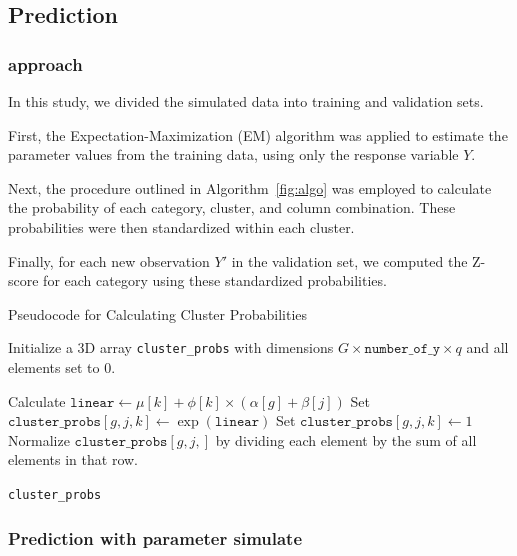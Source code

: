 \documentclass{article}
\begin{document}
\subsection{Prediction}

\subsubsection*{approach}

In this study, we divided the simulated data into training and validation sets.

First, the Expectation-Maximization (EM) algorithm was applied to estimate the parameter values from the training data, using only the response variable $Y$.

Next, the procedure outlined in Algorithm~\ref{fig:algo} was employed to calculate the probability of each category, cluster, and column combination. 
These probabilities were then standardized within each cluster.

Finally, for each new observation $Y'$ in the validation set, we computed the Z-score for each category using these standardized probabilities.
\begin{algorithm}
  \caption{Pseudocode for Calculating Cluster Probabilities}
  \label{fig:algo}
  \begin{algorithmic}[1]
  \STATE Initialize a 3D array \texttt{cluster\_probs} with dimensions $G \times \texttt{number\_of\_y} \times q$ and all elements set to 0.
  
                  \STATE Calculate $\texttt{linear} \gets \mu[k] + \phi[k] \times (\alpha[g] + \beta[j])$
                  \STATE Set $\texttt{cluster\_probs}[g, j, k] \gets \exp(\texttt{linear})$
              \ELSE
                  \STATE Set $\texttt{cluster\_probs}[g, j, k] \gets 1$
              \ENDIF
          \ENDFOR
          \STATE Normalize $\texttt{cluster\_probs}[g, j,]$ by dividing each element by the sum of all elements in that row.
      \ENDFOR
  \ENDFOR
  
  \RETURN \texttt{cluster\_probs}
  \end{algorithmic}
  \end{algorithm}

\subsubsection*{Prediction with parameter simulate}
\end{document}
